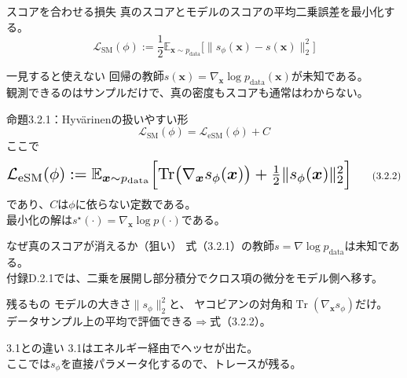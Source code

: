 \asmain
\begin{frame}{スコアを合わせる損失}
    真のスコアとモデルのスコアの平均二乗誤差を最小化する。
    \[
        \mathcal{L}_{\mathrm{SM}}(\phi)
        :=
        \frac12
        \mathbb{E}_{\bm{x}\sim p_{\mathrm{data}}}
        \bigl[
        \|s_\phi(\bm{x})-s(\bm{x})\|_2^2
        \bigr]
        \tag{3.2.1}
    \]
    \begin{block}{一見すると使えない}
        回帰の教師$s(\bm{x})=\nabla_{\bm{x}}\log p_{\mathrm{data}}(\bm{x})$が未知である。\\
        観測できるのはサンプルだけで、真の密度もスコアも通常はわからない。
    \end{block}
\end{frame}
\asmain
\begin{frame}{命題3.2.1：Hyv\"arinenの扱いやすい形}
    \[
        \mathcal{L}_{\mathrm{SM}}(\phi)
        =
        \mathcal{L}_{\mathrm{eSM}}(\phi)+C
    \]
    ここで
    \[
        \resizebox{0.98\textwidth}{!}{$
        \mathcal{L}_{\mathrm{eSM}}(\phi)
        :=
        \mathbb{E}_{\bm{x}\sim p_{\mathrm{data}}}
        \Bigl[
        \operatorname{Tr}\bigl(\nabla_{\bm{x}}s_\phi(\bm{x})\bigr)
        +
        \tfrac12\|s_\phi(\bm{x})\|_2^2
        \Bigr]
        $}
        \tag{3.2.2}
    \]
    であり、$C$は$\phi$に依らない定数である。\\
    最小化の解は$s^\star(\cdot)=\nabla_{\bm{x}}\log p(\cdot)$である。
\end{frame}
\assuppl
\begin{frame}{なぜ真のスコアが消えるか（狙い）}
    式（3.2.1）の教師$s=\nabla\log p_{\mathrm{data}}$は未知である。\\
    付録D.2.1では、二乗を展開し部分積分でクロス項の微分をモデル側へ移す。
    \begin{exampleblock}{残るもの}
        モデルの大きさ$\|s_\phi\|_2^2$と、
        ヤコビアンの対角和$\operatorname{Tr}(\nabla_{\bm{x}}s_\phi)$だけ。\\
        データサンプル上の平均で評価できる$\Rightarrow$式（3.2.2）。
    \end{exampleblock}
    \begin{exampleblock}{3.1との違い}
        3.1はエネルギー経由でヘッセが出た。\\
        ここでは$s_\phi$を直接パラメータ化するので、トレースが残る。
    \end{exampleblock}
\end{frame}
